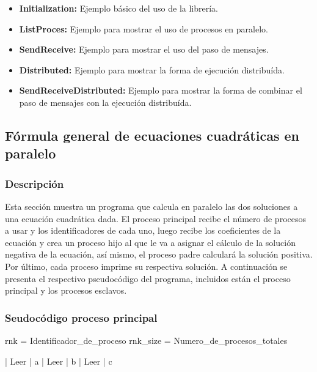 \documentclass{article}
\begin{document}
\begin{itemize}
    \item \textbf{Initialization:} Ejemplo básico del uso de la
        librería.

    \item \textbf{ListProces:} Ejemplo para mostrar el uso de
        procesos en paralelo.

    \item \textbf{SendReceive:} Ejemplo para mostrar el uso del
        paso de mensajes.

    \item \textbf{Distributed:} Ejemplo para mostrar la forma
        de ejecución distribuída.

    \item \textbf{SendReceiveDistributed:} Ejemplo para mostrar
        la forma de combinar el paso de mensajes con la
        ejecución distribuída.
\end{itemize}

\subsection{Fórmula general de ecuaciones cuadráticas en paralelo}

\subsubsection{Descripción}

Esta sección muestra un programa que calcula en paralelo las dos soluciones
a una ecuación cuadrática dada. El proceso principal recibe el número de procesos
a usar y los identificadores de cada uno, luego recibe los coeficientes de la ecuación
y crea un proceso hijo al que le va a asignar el cálculo de la solución negativa de
la ecuación, así mismo, el proceso padre calculará la solución positiva. Por último, cada
proceso imprime su respectiva solución. A continuación se presenta el respectivo pseudocódigo
del programa, incluidos están el proceso principal y los procesos esclavos.

\subsubsection{Seudocódigo proceso principal}

\begin{program}
    rnk = Identificador\_de\_proceso
    rnk\_size = Numero\_de\_procesos\_totales

    | Leer | a 
    | Leer | b 
    | Leer | c 
\end{program}
\end{document}
